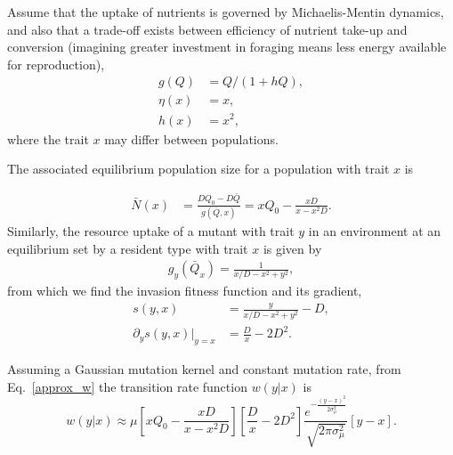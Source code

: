 Assume that the uptake of nutrients is governed by Michaelis-Mentin dynamics, and also that a trade-off exists between efficiency of nutrient take-up and conversion (imagining greater investment in foraging means less energy available for reproduction),
\begin{align*}
	g(Q) & = Q/(1+hQ),  \\
	\eta(x) & = x, \\
	h(x) & = x^2,
\end{align*}
where the trait $x$ may differ between populations.
 
The associated equilibrium population size for a population with trait $x$ is 
 
\begin{align*}
	\bar N(x) & = \frac{D Q_0 - D\bar Q}{g(\bar Q, x)} = x Q_0 - \frac{xD}{x-x^2D}.
\end{align*}
Similarly, the resource uptake of a mutant with trait $y$ in an environment at an equilibrium set by a resident type with trait $x$ is given by 
\begin{align*}
	g_y(\bar Q_x) = \frac{1}{x/D-x^2+y^2},
\end{align*}
from which we find the invasion fitness function and its gradient,
\begin{align*}
	s(y,x) &= \frac{y}{x/D-x^2+y^2} - D, \\
	\partial_y s(y,x)|_{y=x} &= \frac{D}{x} - 2D^2.
\end{align*}
 
Assuming a Gaussian mutation kernel and constant mutation rate, from Eq.~\eqref{approx_w} the transition rate function $w(y|x)$ is
\begin{equation}
	w(y|x) \approx \mu \left[ x Q_0 - \frac{xD}{x-x^2D}\right] \left[ \frac{D}{x} - 2D^2 \right]\frac{e^{-\frac{(y-x)^2}{2\sigma_{\mu}^2}} }{\sqrt{2\pi\sigma_{\mu}^2}}[y-x]. 
\end{equation}
 
